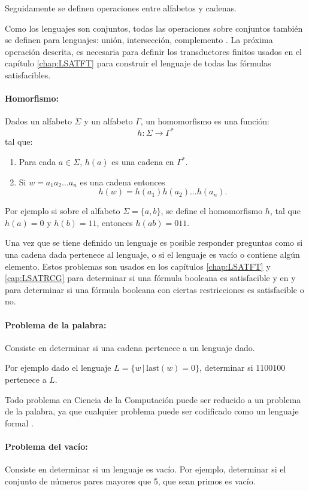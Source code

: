 Seguidamente se definen operaciones entre alfabetos y cadenas.

Como los lenguajes son conjuntos, todas las operaciones sobre conjuntos también se definen para lenguajes: unión, intersección, complemento \cite{authomataTheory}.
La próxima operación descrita, es necesaria para definir los transductores finitos usados en el capítulo \ref{chap:LSATFT} para 
construir el lenguaje de todas las fórmulas satisfacibles.

\paragraph{Homorfismo:} Dados un alfabeto \( \Sigma \) y un alfabeto \( \Gamma \), un homomorfismo es una función:
\[
  h: \Sigma \to \Gamma^*
\]
tal que:
\begin{enumerate}
  \item Para cada \( a \in \Sigma \), \( h(a) \) es una cadena en \( \Gamma^* \).
  \item Si $w=a_1a_2\ldots a_n$ es una cadena entonces
        $$h(w)=h(a_1)h(a_2)\ldots h(a_n).$$
\end{enumerate}

Por ejemplo si sobre el alfabeto $\Sigma=\{a,b\}$, se define el homomorfismo $h$, tal que $h(a)=0$ y $h(b)=11$, entonces
$h(ab)=011$.


Una vez que se tiene definido un lenguaje es posible responder preguntas como si una cadena dada pertenece al lenguaje, o si el lenguaje es vacío o contiene algún elemento.
Estos problemas son usados en los capítulos \ref{chap:LSATFT} y \ref{cap:LSATRCG} para determinar si una fórmula booleana
es satisfacible y en \cite{aCFSAT} y \cite{aSRCSAT} para determinar si una fórmula booleana con ciertas restricciones es 
satisfacible o no.

\paragraph{Problema de la palabra:} Consiste en determinar si una cadena pertenece a un lenguaje dado.

Por ejemplo dado el lenguaje $L=\{w\,|\,\text{last}(w)=0\}$, determinar si $1100100$ pertenece a $L$.

Todo problema en Ciencia de la Computación puede ser reducido a un problema de la palabra, ya que cualquier problema puede ser codificado como un lenguaje formal \cite{authomataTheory}.

\paragraph{Problema del vacío:} Consiste en determinar si un lenguaje es vacío. 
Por ejemplo, determinar si el conjunto de números pares mayores que 5, que sean primos es vacío.

